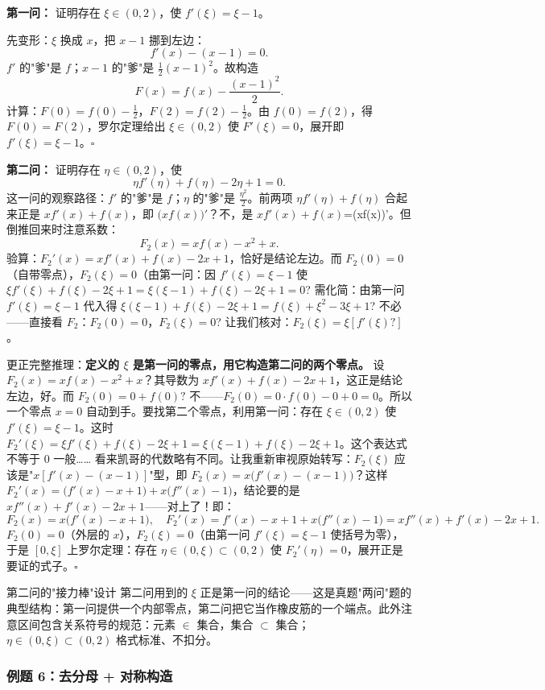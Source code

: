 \documentclass[a4paper]{article}
\begin{document}
\textbf{第一问：} 证明存在 $\xi\in(0,2)$，使 $f'(\xi)=\xi-1$。

先变形：$\xi$ 换成 $x$，把 $x-1$ 挪到左边：
\[
f'(x)-(x-1)=0.
\]
$f'$ 的"爹"是 $f$；$x-1$ 的"爹"是 $\frac{1}{2}(x-1)^2$。故构造
\[
F(x)=f(x)-\frac{(x-1)^2}{2}.
\]
计算：$F(0)=f(0)-\frac{1}{2}$，$F(2)=f(2)-\frac{1}{2}$。由 $f(0)=f(2)$，得 $F(0)=F(2)$，罗尔定理给出 $\xi\in(0,2)$ 使 $F'(\xi)=0$，展开即 $f'(\xi)=\xi-1$。$\square$

\textbf{第二问：} 证明存在 $\eta\in(0,2)$，使
\[
\eta f'(\eta)+f(\eta)-2\eta+1=0.
\]
这一问的观察路径：$f'$ 的"爹"是 $f$；$\eta$ 的"爹"是 $\frac{\eta^2}{2}$。前两项 $\eta f'(\eta)+f(\eta)$ 合起来正是 $xf'(x)+f(x)$，即 $\big(xf(x)\big)'$？不，是 \textbf{$xf'(x)+f(x)$}=\big(xf(x)\big)'。但倒推回来时注意系数：
\[
F_2(x)=xf(x)-x^2+x .
\]
验算：$F_2'(x)=xf'(x)+f(x)-2x+1$，恰好是结论左边。而 $F_2(0)=0$（自带零点），$F_2(\xi)=0$（由第一问：因 $f'(\xi)=\xi-1$ 使 $\xi f'(\xi)+f(\xi)-2\xi+1=\xi(\xi-1)+f(\xi)-2\xi+1=0$? 需化简：由第一问 $f'(\xi)=\xi-1$ 代入得 $\xi(\xi-1)+f(\xi)-2\xi+1=f(\xi)+\xi^2-3\xi+1$? 不必——直接看 $F_2$：$F_2(0)=0$，$F_2(\xi)=0$? 让我们核对：$F_2(\xi)=\xi[f'(\xi)?]$。

更正完整推理：\textbf{定义的 $\xi$ 是第一问的零点，用它构造第二问的两个零点。} 设 $F_2(x)=xf(x)-x^2+x$？其导数为 $xf'(x)+f(x)-2x+1$，这正是结论左边，好。而 $F_2(0)=0+f(0)?$ 不——$F_2(0)=0\cdot f(0)-0+0=0$。所以一个零点 $x=0$ 自动到手。要找第二个零点，利用第一问：存在 $\xi\in(0,2)$ 使 $f'(\xi)=\xi-1$。这时 $F_2'(\xi)=\xi f'(\xi)+f(\xi)-2\xi+1=\xi(\xi-1)+f(\xi)-2\xi+1$。这个表达式不等于 0 一般…… 看来凯哥的代数略有不同。让我重新审视原始转写：$F_2(\xi)$ 应该是"$x[f'(x)-(x-1)]$"型，即 $F_2(x)=x\big(f'(x)-(x-1)\big)$？这样 $F_2'(x)=\big(f'(x)-x+1\big)+x\big(f''(x)-1\big)$，结论要的是 $xf''(x)+f'(x)-2x+1$——对上了！即：
\[
F_2(x)=x\big(f'(x)-x+1\big),\quad F_2'(x)=f'(x)-x+1+x\big(f''(x)-1\big)=x f''(x)+f'(x)-2x+1 .
\]
$F_2(0)=0$（外层的 $x$），$F_2(\xi)=0$（由第一问 $f'(\xi)=\xi-1$ 使括号为零），于是 $[0,\xi]$ 上罗尔定理：存在 $\eta\in(0,\xi)\subset(0,2)$ 使 $F_2'(\eta)=0$，展开正是要证的式子。$\square$

\begin{knowledgebox}{第二问的"接力棒"设计}
第二问用到的 $\xi$ 正是第一问的结论——这是真题"两问"题的典型结构：第一问提供一个内部零点，第二问把它当作橡皮筋的一个端点。此外注意区间包含关系符号的规范：元素 $\in$ 集合，集合 $\subset$ 集合；$\eta\in(0,\xi)\subset(0,2)$ 格式标准、不扣分。
\end{knowledgebox}

\subsubsection{例题 6：去分母 + 对称构造}
\end{document}
